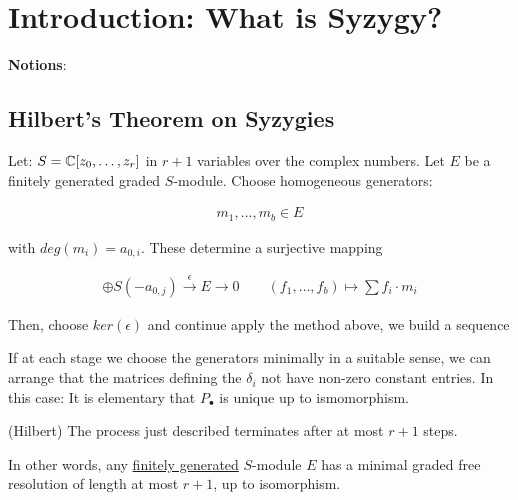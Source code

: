 \documentclass[Total.tex]{subfiles}
\begin{document}
	
	\chapter{Introduction: What is Syzygy?}
	
		\textbf{Notions}:
		
		
	
		\section{Hilbert's Theorem on Syzygies}
		
			\begin{prob}
				Let: $S=\mathbb{C}[z_0,\dots,z_r]$ in $r+1$ variables over the complex numbers. Let $E$ be a finitely generated graded $S$-module. Choose homogeneous generators:
				
				\begin{gather*}
					m_1,\dots,m_b\in E
				\end{gather*}
				
				with $deg(m_i)=a_{0,i}$. These determine a surjective mapping
				
				\begin{gather*}
					\oplus S(-a_{0,j})\stackrel{\epsilon}{\rightarrow} E\rightarrow 0\qquad (f_1,\dots,f_b)\mapsto \sum f_i\cdot m_i
				\end{gather*}
				
				Then, choose $ker(\epsilon)$ and continue apply the method above, we build a sequence
				
				\begin{center}
				\end{center}
			\end{prob}
			
			If at each stage we choose the generators minimally in a suitable sense, we can arrange that the matrices defining the $\delta_i$ not have non-zero constant entries. In this case: It is elementary that $P_\bullet$ is unique up to ismomorphism.
			
			\begin{theorem}
				(Hilbert) The process just described terminates after at most $r+1$ steps.
				
				In other words, any \underline{finitely generated} $S$-module $E$ has a minimal graded free resolution of length at most $r+1$, up to isomorphism.
			\end{theorem}
			
\end{document}
